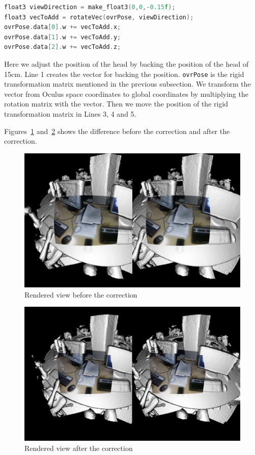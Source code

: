 \documentclass[12pt]{article}
\begin{document}
\begin{lstlisting}[language=C++, caption={C++ code for adjusting the position of the user}, label={lst:position}]
float3 viewDirection = make_float3(0,0,-0.15f);
float3 vecToAdd = rotateVec(ovrPose, viewDirection);
ovrPose.data[0].w += vecToAdd.x;
ovrPose.data[1].w += vecToAdd.y;
ovrPose.data[2].w += vecToAdd.z;
\end{lstlisting}

Here we adjust the position of the head by backing the position of the head of 15cm. Line 1 creates the vector for backing the position. \texttt{ovrPose} is the rigid transformation matrix mentioned in the previous subsection. We transform the vector from Oculus space coordinates to global coordinates by multiplying the rotation matrix with the vector. Then we move the position of the rigid transformation matrix in Lines 3, 4 and 5.

Figures~\ref{fig:notcorrect} and~\ref{fig:correct} shows the difference before the correction and after the correction.

\begin{figure}[!h]
  \centering
  \includegraphics[scale=0.3]{NotCorrected.png}
  \caption{\label{fig:notcorrect} Rendered view before the correction}
\end{figure}

\begin{figure}[!h]
  \centering
  \includegraphics[scale=0.3]{Corrected.png}
  \caption{\label{fig:correct} Rendered view after the correction}
\end{figure}
\end{document}
